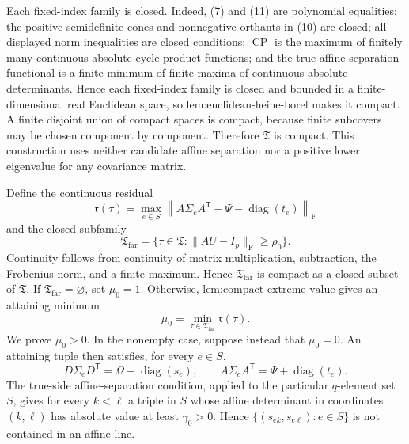 Each fixed-index family is closed. Indeed, (7) and (11) are polynomial equalities; the positive-semidefinite cones and nonnegative orthants in (10) are closed; all displayed norm inequalities are closed conditions; \(\operatorname{CP}\) is the maximum of finitely many continuous absolute cycle-product functions; and the true affine-separation functional is a finite minimum of finite maxima of continuous absolute determinants. Hence each fixed-index family is closed and bounded in a finite-dimensional real Euclidean space, so \(\text{lem:euclidean-heine-borel}\) makes it compact. A finite disjoint union of compact spaces is compact, because finite subcovers may be chosen component by component. Therefore \(\mathfrak T\) is compact. This construction uses neither candidate affine separation nor a positive lower eigenvalue for any covariance matrix.

Define the continuous residual
\[
\mathfrak r(\tau)=
\max_{e\in S}
\left\|A\Sigma_eA^{\mathsf T}
-\Psi-\operatorname{diag}(t_e)\right\|_{\mathrm F}
\tag{17}
\]
and the closed subfamily
\[
\mathfrak T_{\mathrm{far}}
=\{\tau\in\mathfrak T:\|AU-I_p\|_{\mathrm F}\geq\rho_0\}.
\tag{18}
\]
Continuity follows from continuity of matrix multiplication, subtraction, the Frobenius norm, and a finite maximum. Hence \(\mathfrak T_{\mathrm{far}}\) is compact as a closed subset of \(\mathfrak T\). If \(\mathfrak T_{\mathrm{far}}=\varnothing\), set \(\mu_0=1\). Otherwise, \(\text{lem:compact-extreme-value}\) gives an attaining minimum
\[
\mu_0=\min_{\tau\in\mathfrak T_{\mathrm{far}}}\mathfrak r(\tau).
\tag{19}
\]
We prove \(\mu_0>0\). In the nonempty case, suppose instead that \(\mu_0=0\). An attaining tuple then satisfies, for every \(e\in S\),
\[
D\Sigma_eD^{\mathsf T}=\Omega+\operatorname{diag}(s_e),
\qquad
A\Sigma_eA^{\mathsf T}=\Psi+\operatorname{diag}(t_e).
\tag{20}
\]
The true-side affine-separation condition, applied to the particular \(q\)-element set \(S\), gives for every \(k<\ell\) a triple in \(S\) whose affine determinant in coordinates \((k,\ell)\) has absolute value at least \(\gamma_0>0\). Hence \(\{(s_{ek},s_{e\ell}):e\in S\}\) is not contained in an affine line.

